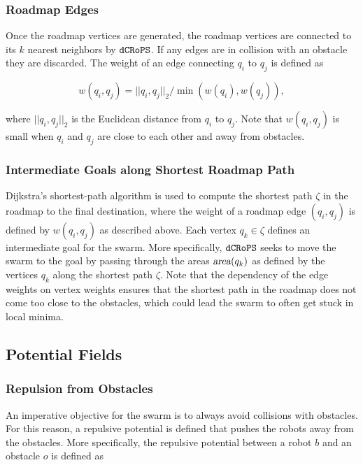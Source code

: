 \documentclass[letterpaper, 10pt, conference]{ieeeconf}
\newcommand{\Acronym}[1]{\ensuremath{{\small{\texttt{#1}}}}}
\newcommand{\Var}[1]{\ensuremath{{\small{\textsl{#1}}}}}
\newcommand{\Name}{\Acronym{dCRoPS}}
\begin{document}
\subsubsection{Roadmap Edges}

Once the roadmap vertices are generated, the roadmap vertices are connected to
its $k$ nearest neighbors by $\Name$. If any edges are in collision with an
obstacle they are discarded. The weight of an edge connecting $q_i$ to $q_j$ is
defined as

$$ w(q_i, q_j) = ||q_i, q_j||_2 / \min(w(q_i), w(q_j)), $$ 

where $||q_i, q_j||_2$ is the Euclidean distance from $q_i$ to $q_j$. Note that
$w(q_i, q_j)$ is small when $q_i$ and $q_j$ are close to each other and away
from obstacles.



\subsubsection{Intermediate Goals along Shortest Roadmap Path}

Dijkstra's shortest-path algorithm is used to compute the shortest path $\zeta$
in the roadmap to the final destination, where the weight of a roadmap edge
$(q_i, q_j)$ is defined by $w(q_i, q_j)$ as described above. Each vertex $q_k
\in \zeta$ defines an intermediate goal for the swarm. More specifically,
$\Name$ seeks to move the swarm to the goal by passing through the areas
$\Var{area}(q_k)$ as defined by the vertices $q_k$ along the shortest path
$\zeta$. Note that the dependency of the edge weights on vertex weights ensures
that the shortest path in the roadmap does not come too close to the obstacles,
which could lead the swarm to often get stuck in local minima.

\subsection{Potential Fields}
\label{sec:PF}

\subsubsection{Repulsion from Obstacles}
\label{sec:PFobst} An imperative objective for
the swarm is to always avoid collisions with obstacles. For this
reason, a repulsive potential is defined that pushes the robots away
from the obstacles. More specifically, the repulsive potential between
a robot $b$ and an obstacle $o$ is defined as
\end{document}
